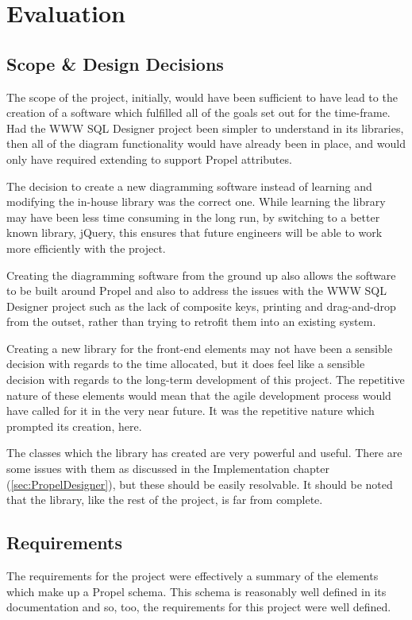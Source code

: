 \cleardoublepage
\chapter{Evaluation}%
\section{Scope \& Design Decisions}
The scope of the project, initially, would have been sufficient to have lead to the creation of a software which fulfilled all of the goals set out for the time-frame. Had the WWW SQL Designer project been simpler to understand in its libraries, then all of the diagram functionality would have already been in place, and would only have required extending to support Propel attributes.

The decision to create a new diagramming software instead of learning and modifying the in-house library was the correct one. While learning the library may have been less time consuming in the long run, by switching to a better known library, jQuery, this ensures that future engineers will be able to work more efficiently with the project.

Creating the diagramming software from the ground up also allows the software to be built around Propel and also to address the issues with the WWW SQL Designer project such as the lack of composite keys, printing and drag-and-drop from the outset, rather than trying to retrofit them into an existing system.

Creating a new library for the front-end elements may not have been a sensible decision with regards to the time allocated, but it does feel like a sensible decision with regards to the long-term development of this project. The repetitive nature of these elements would mean that the agile development process would have called for it in the very near future. It was the repetitive nature which prompted its creation, here.

The classes which the library has created are very powerful and useful. There are some issues with them as discussed in the Implementation chapter (\ref{sec:PropelDesigner}), but these should be easily resolvable. It should be noted that the library, like the rest of the project, is far from complete.

\section{Requirements}
The requirements for the project were effectively a summary of the elements which make up a Propel schema. This schema is reasonably well defined in its documentation and so, too, the requirements for this project were well defined.

